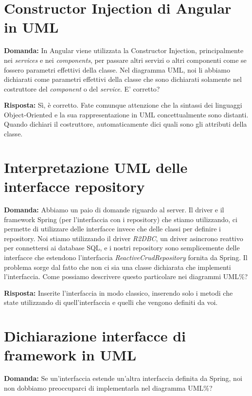 \documentclass{article}
\begin{document}
\section{Constructor Injection di Angular in UML}%
\label{sec:constructor_injection_angular_uml}

\textbf{Domanda:} In Angular viene utilizzata la Constructor Injection, principalmente nei \textit{services} e nei \textit{components}, per passare altri servizi o altri componenti come se fossero parametri effettivi della classe. Nel diagramma UML, noi li abbiamo dichiarati come parametri effettivi della classe che sono dichiarati solamente nel costruttore del \textit{component} o del \textit{service}. E' corretto?

\textbf{Risposta:} Sì, è corretto. Fate comunque attenzione che la sintassi dei linguaggi Object-Oriented e la sua rappresentazione in UML concettualmente sono distanti. Quando dichiari il costruttore, automaticamente dici quali sono gli attributi della classe.

\section{Interpretazione UML delle interfacce repository}%
\label{sec:interpretazione_uml_interfacce_repository}

\textbf{Domanda:} Abbiamo un paio di domande riguardo al server. Il driver e il framework Spring (per l'interfaccia con i repository) che stiamo utilizzando, ci permette di utilizzare delle interfacce invece che delle classi per definire i repository. Noi stiamo utilizzando il driver \textit{R2DBC}, un driver asincrono reattivo per connettersi ai database SQL, e i nostri repository sono semplicemente delle interfacce che estendono l'interfaccia \textit{ReactiveCrudRepository} fornita da Spring. Il problema sorge dal fatto che non ci sia una classe dichiarata che implementi l'interfaccia. Come possiamo descrivere questo particolare nei diagrammi UML\%?

\textbf{Risposta:} Inserite l'interfaccia in modo classico, inserendo solo i metodi che state utilizzando di quell'interfaccia e quelli che vengono definiti da voi.

\section{Dichiarazione interfacce di framework in UML}%
\label{sec:dichiarazione_interfacce_framework_uml}

\textbf{Domanda:} Se un'interfaccia estende un'altra interfaccia definita da Spring, noi non dobbiamo preoccuparci di implementarla nel diagramma UML\%?
\end{document}
